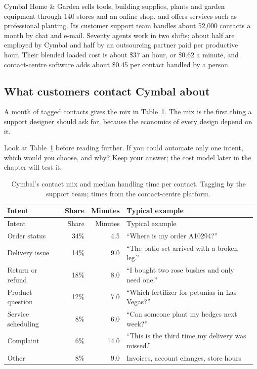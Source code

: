 Cymbal Home \& Garden sells tools, building supplies, plants and garden equipment through 140 stores and an online shop, and offers services such as professional planting. Its customer support team handles about 52{,}000 contacts a month by chat and e-mail. Seventy agents work in two shifts; about half are employed by Cymbal and half by an outsourcing partner paid per productive hour. Their blended loaded cost is about \$37 an hour, or \$0.62 a minute, and contact-centre software adds about \$0.45 per contact handled by a person.

\subsection{What customers contact Cymbal about}

A month of tagged contacts gives the mix in Table~\ref{tab:intents}. The mix is the first thing a support designer should ask for, because the economics of every design depend on it.

\begin{thinkabout}
Look at Table~\ref{tab:intents} before reading further. If you could automate only one intent, which would you choose, and why? Keep your answer; the cost model later in the chapter will test it.
\end{thinkabout}

\begingroup
\small
\begin{longtable}{@{}lrrl@{}}
\caption{Cymbal's contact mix and median handling time per contact. Tagging by the support team; times from the contact-centre platform.}\label{tab:intents}\\
\toprule
\rowcolor{coHead} Intent & Share & Minutes & Typical example \\
\midrule
\endfirsthead
\toprule
\rowcolor{coHead} Intent & Share & Minutes & Typical example \\
\midrule
\endhead
Order status & 34\% & 4.5 & ``Where is my order A10294?'' \\
Delivery issue & 14\% & 9.0 & ``The patio set arrived with a broken leg.'' \\
Return or refund & 18\% & 8.0 & ``I bought two rose bushes and only need one.'' \\
Product question & 12\% & 7.0 & ``Which fertilizer for petunias in Las Vegas?'' \\
Service scheduling & 8\% & 6.0 & ``Can someone plant my hedges next week?'' \\
Complaint & 6\% & 14.0 & ``This is the third time my delivery was missed.'' \\
Other & 8\% & 9.0 & Invoices, account changes, store hours \\
\bottomrule
\end{longtable}
\endgroup

